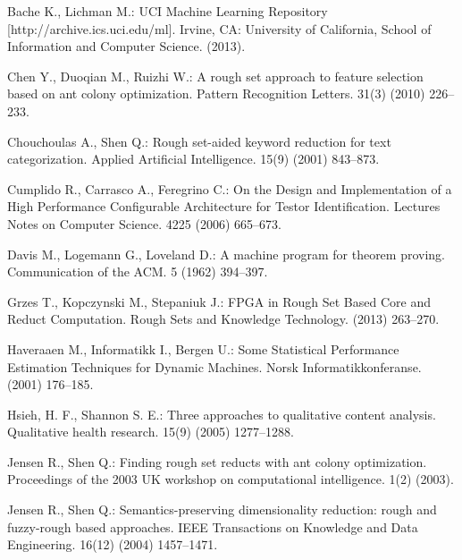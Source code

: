 \documentclass[11pt]{article}   %
\begin{document}
  

\begin{thebibliography}{}

	Bache K., Lichman M.:  
	UCI Machine Learning Repository [http://archive.ics.uci.edu/ml]. 
	Irvine, CA: University of California, School of Information and Computer Science. (2013).
	
	Chen Y., Duoqian M., Ruizhi W.:
	A rough set approach to feature selection based on ant colony optimization.
	Pattern Recognition Letters. 31(3) (2010) 226--233.

	Chouchoulas A., Shen Q.:
	Rough set-aided keyword reduction for text categorization.
	Applied Artificial Intelligence. 15(9) (2001) 843--873.
	
	Cumplido R., Carrasco A., Feregrino C.:
	On the Design and Implementation of a High Performance Configurable Architecture for Testor Identification.
	Lectures Notes on Computer Science. 4225 (2006) 665--673.
	
	Davis M., Logemann G., Loveland D.:
	A machine program for theorem proving.
	Communication of the ACM. 5 (1962) 394--397.

	Grzes T., Kopczynski M., Stepaniuk J.:
	FPGA in Rough Set Based Core and Reduct Computation. 
	Rough Sets and Knowledge Technology.	(2013) 263--270.

	Haveraaen M., Informatikk I.,  Bergen U.:
	Some Statistical Performance Estimation Techniques for Dynamic Machines. 
	Norsk Informatikkonferanse. (2001) 176--185.

	Hsieh, H. F., Shannon S. E.:
	Three approaches to qualitative content analysis.
	Qualitative health research. 15(9) (2005) 1277--1288.
	
	Jensen R., Shen Q.:
	Finding rough set reducts with ant colony optimization.
	Proceedings of the 2003 UK workshop on computational intelligence. 1(2) (2003).

	Jensen R., Shen Q.:
	Semantics-preserving dimensionality reduction: rough and fuzzy-rough based approaches.
	IEEE Transactions on Knowledge and Data Engineering. 16(12) (2004) 1457--1471.
	

\end{thebibliography}
\end{document}
